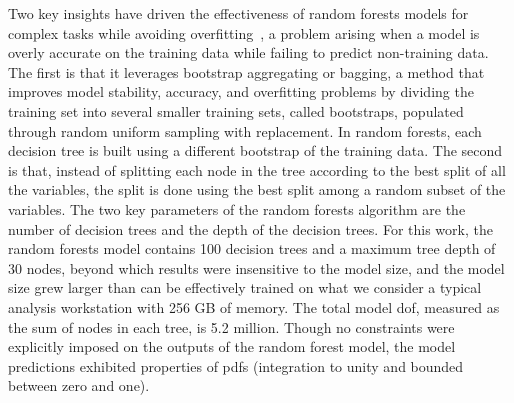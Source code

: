 \documentclass[review]{elsarticle}
\begin{document}
Two key insights have driven the effectiveness of random forests
models for complex tasks while avoiding
overfitting~\cite{Fernandez-Delgado2014,Liaw2002}, a problem arising
when a model is overly accurate on the training data while failing to
predict non-training data. The first is that it leverages bootstrap
aggregating or bagging, a method that improves model stability,
accuracy, and overfitting problems by dividing the training set into
several smaller training sets, called bootstraps, populated through
random uniform sampling with replacement. In random forests, each
decision tree is built using a different bootstrap of the training
data. The second is that, instead of splitting each node in the tree
according to the best split of all the variables, the split is done
using the best split among a random subset of the variables. The two
key parameters of the random forests algorithm are the number of
decision trees and the depth of the decision trees. For this work, the
random forests model contains 100 decision trees and a maximum tree
depth of 30 nodes, beyond which results were insensitive to the model
size, and the model size grew larger than can be effectively trained
on what we consider a typical analysis workstation with 256 GB of
memory. The total model \gls{dof}, measured as the sum of nodes in
each tree, is 5.2 million. Though no constraints were explicitly
imposed on the outputs of the random forest model, the model
predictions exhibited properties of \glspl{pdf} (integration to unity
and bounded between zero and one).
\end{document}
